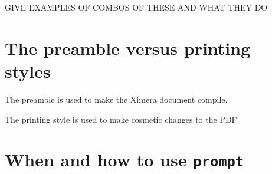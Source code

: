 \documentclass{ximera}
\begin{document}
GIVE EXAMPLES OF COMBOS OF THESE AND WHAT THEY DO

\section{The preamble versus printing styles}

The preamble is used to make the Ximera document compile.

The printing style is used to make cosmetic changes to the PDF.



\section{When and how to use \texttt{prompt}}
\end{document}
